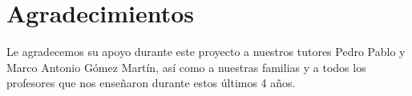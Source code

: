 
\chapter*{Agradecimientos}

Le agradecemos su apoyo durante este proyecto a nuestros tutores Pedro Pablo y Marco Antonio Gómez Martín, así como a nuestras familias y a todos los profesores que nos enseñaron durante estos últimos 4 años.